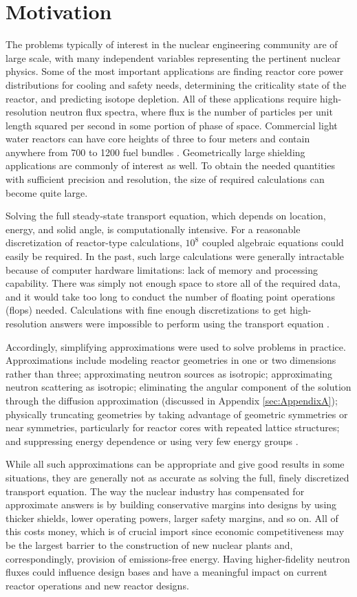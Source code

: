 \section{Motivation}
The problems typically of interest in the nuclear engineering community are of large scale, with many independent variables representing the pertinent nuclear physics. Some of the most important applications are finding reactor core power distributions for cooling and safety needs, determining the criticality state of the reactor, and predicting isotope depletion. All of these applications require high-resolution neutron flux spectra, where flux is the number of particles per unit length squared per second in some portion of phase of space. Commercial light water reactors can have core heights of three to four meters and contain anywhere from 700 to 1200 fuel bundles \cite{Fennern2006}. Geometrically large shielding applications are commonly of interest as well. To obtain the needed quantities with sufficient precision and resolution, the size of required calculations can become quite large. 

Solving the full steady-state transport equation, which depends on location, energy, and solid angle, is computationally intensive. For a reasonable discretization of reactor-type calculations, $10^{8}$ coupled algebraic equations could easily be required. In the past, such large calculations were generally intractable because of computer hardware limitations: lack of memory and processing capability. There was simply not enough space to store all of the required data, and it would take too long to conduct the number of floating point operations (flops) needed. Calculations with fine enough discretizations to get high-resolution answers were impossible to perform using the transport equation \cite{Duderstadt1976}. 

Accordingly, simplifying approximations were used to solve problems in practice. Approximations include modeling reactor geometries in one or two dimensions rather than three; approximating neutron sources as isotropic; approximating neutron scattering as isotropic; eliminating the angular component of the solution through the diffusion approximation (discussed in Appendix \ref{sec:AppendixA}); physically truncating geometries by taking advantage of geometric symmetries or near symmetries, particularly for reactor cores with repeated lattice structures; and suppressing energy dependence or using very few energy groups \cite{Duderstadt1976}.

While all such approximations can be appropriate and give good results in some situations, they are generally not as accurate as solving the full, finely discretized transport equation. The way the nuclear industry has compensated for approximate answers is by building conservative margins into designs by using thicker shields, lower operating powers, larger safety margins, and so on. All of this costs money, which is of crucial import since economic competitiveness may be the largest barrier to the construction of new nuclear plants and, correspondingly, provision of emissions-free energy. Having higher-fidelity neutron fluxes could influence design bases and have a meaningful impact on current reactor operations and new reactor designs. 

